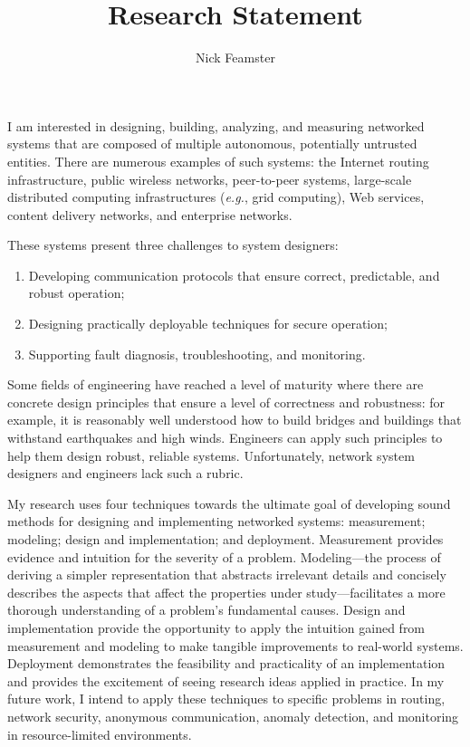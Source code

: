 \documentclass[11pt]{article}
\newcommand{\eg}{{\em e.g.}}
\begin{document}
\title{Research Statement}
\author{\Large Nick Feamster}
\date{}
\maketitle

I am interested in designing, building, analyzing, and measuring
networked systems that are composed of multiple autonomous, potentially
untrusted entities.  There are numerous examples of such systems: the
Internet routing infrastructure, 
public wireless networks, peer-to-peer systems, large-scale distributed
computing infrastructures (\eg, grid computing), Web services, content delivery
networks, and enterprise networks.

These systems present three challenges to system designers:
\begin{enumerate}
\itemsep=-4pt
\topsep=-5pt
\item Developing communication protocols that ensure correct,
  predictable, and robust 
operation;
\item Designing practically deployable techniques for secure
operation;
\item Supporting fault diagnosis, troubleshooting, and monitoring.
\end{enumerate}
Some fields of engineering have reached a level of maturity where there
are concrete design principles that ensure a level of correctness and
robustness: for example, it is reasonably well understood how to build
bridges and buildings that withstand earthquakes and high winds.
Engineers can apply such principles to help them design robust, reliable
systems.  Unfortunately, network system designers and engineers lack
such a rubric.


My research uses four techniques towards the ultimate goal of developing
sound methods for designing and implementing networked systems:
measurement; modeling; design and implementation; and deployment.
Measurement provides evidence and intuition for the severity
of a problem.  Modeling---the process of deriving a simpler
representation that abstracts irrelevant details and concisely describes
the aspects that affect the properties under study---facilitates a more
thorough understanding of a problem's fundamental causes.  Design and
implementation provide the opportunity to apply the intuition gained
from measurement and modeling to make tangible improvements to
real-world systems.  Deployment demonstrates the feasibility and
practicality of an implementation and provides the excitement of seeing
research ideas applied in practice.  In my future work, I intend to
apply these techniques to specific problems in routing, network
security, anonymous communication, anomaly detection, and monitoring in
resource-limited environments.
\end{document}
